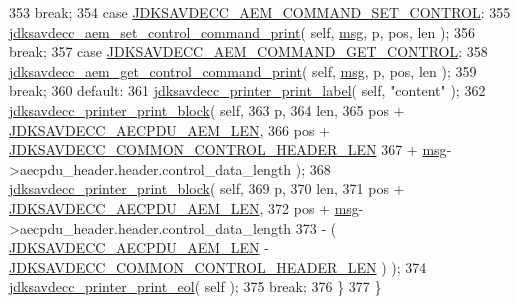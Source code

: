 \begin{DoxyCode}
353         \textcolor{keywordflow}{break};
354     \textcolor{keywordflow}{case} \hyperlink{group__command_ga78648020206806d2992e010573f0ef27}{JDKSAVDECC\_AEM\_COMMAND\_SET\_CONTROL}:
355         \hyperlink{group__aem__print_gad7ab8c1f00ab43eef7206ee43adb8d48}{jdksavdecc\_aem\_set\_control\_command\_print}( \textcolor{keyword}{self}, 
      \hyperlink{maap__log__linux_8c_a0c7e58a50354c4a4d6dad428d0e47029}{msg}, p, pos, len );
356         \textcolor{keywordflow}{break};
357     \textcolor{keywordflow}{case} \hyperlink{group__command_ga5e5b22c644bac1a44abfda29f55bad47}{JDKSAVDECC\_AEM\_COMMAND\_GET\_CONTROL}:
358         \hyperlink{group__aem__print_ga1fd77391f3d8ceb280957198d3512435}{jdksavdecc\_aem\_get\_control\_command\_print}( \textcolor{keyword}{self}, 
      \hyperlink{maap__log__linux_8c_a0c7e58a50354c4a4d6dad428d0e47029}{msg}, p, pos, len );
359         \textcolor{keywordflow}{break};
360     \textcolor{keywordflow}{default}:
361         \hyperlink{group__util_gaf7818b24143b3c7502926a425a242ff5}{jdksavdecc\_printer\_print\_label}( \textcolor{keyword}{self}, \textcolor{stringliteral}{"content"} );
362         \hyperlink{group__util_ga18d7b11e396f21996dedde77febcb22f}{jdksavdecc\_printer\_print\_block}( \textcolor{keyword}{self},
363                                         p,
364                                         len,
365                                         pos + \hyperlink{group__aecpdu__aem_ga225c1b8a460f2631846dee37713da1bc}{JDKSAVDECC\_AECPDU\_AEM\_LEN},
366                                         pos + 
      \hyperlink{group__jdksavdecc__avtp__common__control__header_gaae84052886fb1bb42f3bc5f85b741dff}{JDKSAVDECC\_COMMON\_CONTROL\_HEADER\_LEN}
367                                         + \hyperlink{maap__log__linux_8c_a0c7e58a50354c4a4d6dad428d0e47029}{msg}->aecpdu\_header.header.control\_data\_length );
368         \hyperlink{group__util_ga18d7b11e396f21996dedde77febcb22f}{jdksavdecc\_printer\_print\_block}( \textcolor{keyword}{self},
369                                         p,
370                                         len,
371                                         pos + \hyperlink{group__aecpdu__aem_ga225c1b8a460f2631846dee37713da1bc}{JDKSAVDECC\_AECPDU\_AEM\_LEN},
372                                         pos + \hyperlink{maap__log__linux_8c_a0c7e58a50354c4a4d6dad428d0e47029}{msg}->aecpdu\_header.header.control\_data\_length
373                                         - ( \hyperlink{group__aecpdu__aem_ga225c1b8a460f2631846dee37713da1bc}{JDKSAVDECC\_AECPDU\_AEM\_LEN} - 
      \hyperlink{group__jdksavdecc__avtp__common__control__header_gaae84052886fb1bb42f3bc5f85b741dff}{JDKSAVDECC\_COMMON\_CONTROL\_HEADER\_LEN} ) );
374         \hyperlink{group__util_gacda56c9d3d24593a52c999682fa6e6e3}{jdksavdecc\_printer\_print\_eol}( \textcolor{keyword}{self} );
375         \textcolor{keywordflow}{break};
376     \}
377 \}
\end{DoxyCode}



